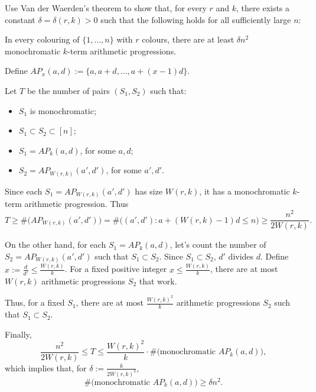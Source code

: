\documentclass[10pt, a4paper]{article}
\begin{document}
\newpage
\begin{prob}
	Use Van der Waerden's theorem to show that, for every $r$ and $k$, there exists a constant $\delta = \delta(r, k) > 0$ such that the following holds for all sufficiently large $n$:

	In every colouring of $\{1, \dots, n\}$ with $r$ colours, there are at least $\delta n^2$ monochromatic $k$-term arithmetic progressions.
\end{prob}
\begin{sol}
	Define $AP_x(a, d) := \{a, a+d, \dots, a+(x-1)d\}$.

	Let $T$ be the number of pairs $(S_1, S_2)$ such that:
	\begin{itemize}
		\item $S_1$ is monochromatic;
		\item $S_1 \subset S_2 \subset [n]$;
		\item $S_1 = AP_k(a, d)$, for some $a, d$;
		\item $S_2 = AP_{W(r, k)}(a', d')$, for some $a', d'$.
	\end{itemize}	

	Since each $S_1 = AP_{W(r, k)}(a', d')$ has size ${W(r, k)}$, it has a monochromatic $k$-term arithmetic progression. Thus \[
		T \ge \#\big(AP_{W(r, k)}(a', d')\big) = \#\big( (a', d') : a + ({W(r, k)}-1)d \le n\big) \ge \frac{n^2}{2{W(r, k)}}.
	\]

	On the other hand, for each $S_1 = AP_k(a, d)$, let's count the number of $S_2 = AP_{W(r, k)}(a', d')$ such that $S_1 \subset S_2$.
	Since $S_1 \subset S_2$, $d'$ divides $d$. Define $x := \frac{d}{d'} \le \frac{{W(r, k)}}{k}$. For a fixed positive integer $x \le \frac{{W(r, k)}}{k}$, there are at most ${W(r, k)}$ arithmetic progressions $S_2$ that work. 

	Thus, for a fixed $S_1$, there are at most $\frac{{W(r, k)}^2}{k}$ arithmetic progressions $S_2$ such that $S_1 \subset S_2$.

	Finally,  \[
		\frac{n^2}{2{W(r, k)}} \le T \le \frac{{W(r, k)}^2}{k} \cdot \#\big(\text{monochromatic }AP_k(a, d)\big),
	\]
	which implies that, for $\delta := \frac{k}{2{W(r, k)}^3}$,
	\[
		\#\big(\text{monochromatic }AP_k(a, d)\big) \ge \delta n^2.
	\]
\end{sol}
\end{document}

